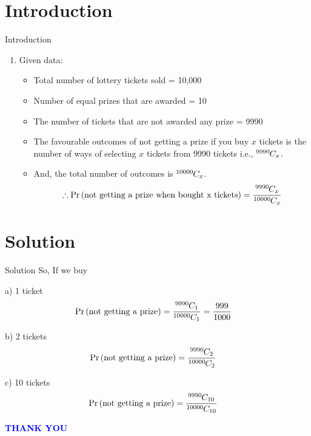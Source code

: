 \documentclass{beamer}
\providecommand{\pr}[1]{\ensuremath{\Pr\left(#1\right)}}
\newcommand*{\permcomb}[4][0mu]{{{}^{#3}\mkern#1#2_{#4}}}
\newcommand*{\comb}[1][-1mu]{\permcomb[#1]{C}}
\begin{document}
\section{Introduction}
\begin{frame}{Introduction}
    \begin{enumerate}[]
    \item Given data:
        \begin{itemize}
        \item Total number of lottery tickets sold = 10,000
        \item Number of equal prizes that are awarded = 10
        \item The number of tickets that are not awarded any prize = 9990 
    \end{itemize}
    
    \begin{corollary}
    \begin{itemize}
        \item The favourable outcomes of not getting a prize if you buy $x$ tickets is the number of ways of selecting $x$ tickets from 9990 tickets i.e., $\comb{9990}{x}$.
        \item And, the total number of outcomes is $\comb{10000}{x}$.
        \begin{align}
        \therefore \pr{\text{not getting a prize when bought x tickets}} = \frac{\comb{9990}{x}}{\comb{10000}{x}}
        \end{align}
    \end{itemize}
    \end{corollary} 
        
    \end{enumerate}
\end{frame}

\section{Solution}
\begin{frame}{Solution}
So, If we buy
    \begin{block}{a) 1 ticket}
    \begin{align}
    \pr{\text{not getting a prize}} &= \frac{\comb{9990}{1}}{\comb{10000}{1}}= \frac{999}{1000}
    \end{align}
    \end{block}
    
    \begin{block}{b) 2 tickets}
    \begin{align}
    \pr{\text{not getting a prize}} &= \frac{\comb{9990}{2}}{\comb{10000}{2}}
    \end{align}
    \end{block}
    
    \begin{block}{c) 10 tickets}
    \begin{align}
    \pr{\text{not getting a prize}} &= \frac{\comb{9990}{10}}{\comb{10000}{10}}
    \end{align}
    \end{block}
\end{frame} 

\begin{frame}
   \centering
    \textcolor{blue}{\Huge{\textbf{THANK YOU}}}
\end{frame}
\end{document}
